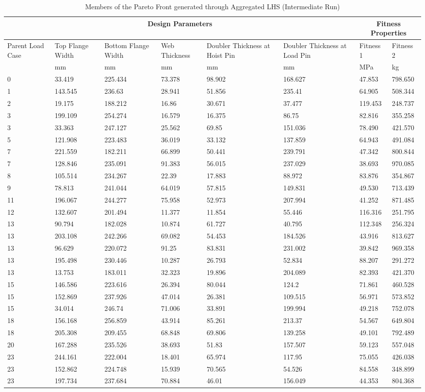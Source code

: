 \begin{table}[!htbp]
\small
\caption{Members of the Pareto Front generated through Aggregated LHS (Intermediate Run)}
\label{tab:pfront_agg_int}
\begin{tabular}{|p{1.5cm}p{1.5cm}p{1.5cm}p{1.4cm}p{2cm}p{2cm}||p{1.5cm}p{1.5cm}|}
\hline
\multicolumn{6}{|c||}{Design Parameters}&\multicolumn{2}{|c|}{Fitness Properties}\\
\hline
Parent Load Case&Top Flange Width&Bottom Flange Width&Web Thickness&Doubler Thickness at Hoist Pin&Doubler Thickness at Load Pin&Fitness 1& Fitness 2\\
\hline
&mm&mm&mm&mm&mm&MPa&kg\\
\hline
0&33.419&225.434&73.378&98.902&168.627&47.853&798.650\\
1&143.545&236.63&28.941&51.856&235.41&64.905&508.344\\
2&19.175&188.212&16.86&30.671&37.477&119.453&248.737\\
3&199.109&254.274&16.579&16.375&86.75&82.816&355.258\\
3&33.363&247.127&25.562&69.85&151.036&78.490&421.570\\
5&121.908&223.483&36.019&33.132&137.859&64.943&491.084\\
7&221.559&182.211&66.899&50.441&239.791&47.342&800.844\\
7&128.846&235.091&91.383&56.015&237.029&38.693&970.085\\
8&105.514&234.267&22.39&17.883&88.972&83.876&354.867\\
9&78.813&241.044&64.019&57.815&149.831&49.530&713.439\\
11&196.067&244.277&75.958&52.973&207.994&41.252&871.485\\
12&132.607&201.494&11.377&11.854&55.446&116.316&251.795\\
13&90.794&182.028&10.874&61.727&40.795&112.348&256.324\\
13&203.108&242.266&69.082&54.453&184.526&43.916&813.627\\
13&96.629&220.072&91.25&83.831&231.002&39.842&969.358\\
13&195.498&230.446&10.287&26.793&52.834&88.207&291.272\\
13&13.753&183.011&32.323&19.896&204.089&82.393&421.370\\
15&146.586&223.616&26.394&80.044&124.2&71.861&460.528\\
15&152.869&237.926&47.014&26.381&109.515&56.971&573.852\\
15&34.014&246.74&71.006&33.891&199.994&49.218&752.078\\
18&156.168&256.859&43.914&85.261&213.37&54.567&649.804\\
18&205.308&209.455&68.848&69.806&139.258&49.101&792.489\\
20&167.288&235.526&38.693&51.83&157.507&59.123&557.048\\
23&244.161&222.004&18.401&65.974&117.95&75.055&426.038\\
23&152.862&224.748&15.939&70.565&54.526&84.558&348.899\\
23&197.734&237.684&70.884&46.01&156.049&44.353&804.368\\
\hline
\end{tabular}
\end{table}

